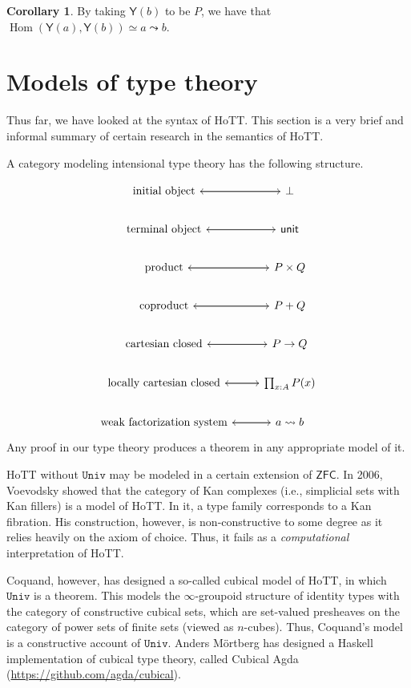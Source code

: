 \documentclass[10pt,letterpaper,cm]{nupset}
\theoremstyle{definition}
\theoremstyle{theorem}
\newtheorem{corollary}[definition]{Corollary}
\theoremstyle{remark}
\newcommand{\1}{\mathbf{1}}
\newcommand{\univ}{\mathtt{Univ}}
\newcommand{\0}{\vec 0}
\DeclareMathOperator{\Hom}{Hom}
\begin{document}
\begin{corollary}
By taking $\mathsf{Y}(b)$ to be $P$, we have that $\Hom(\mathsf{Y}(a), \mathsf{Y}(b)) \simeq a \leadsto b$.
\end{corollary}

\section{Models of type theory}

Thus far, we have looked at the syntax of HoTT. This section is a very brief and informal summary of certain research in the semantics of HoTT.

\medskip

A category modeling intensional type theory has the following structure.

\[
\begin{tikzcd}
\text{initial object} \arrow[r] & \bot \arrow[l] \\
\text{terminal object} \arrow[r] & \mathsf{unit} \arrow[l] \\
\text{product} \arrow[r] & P\times Q \arrow[l] \\
\text{coproduct} \arrow[r] & P + Q \arrow[l] \\
\text{cartesian closed} \arrow[r] & P \to Q \arrow[l] \\
\text{locally cartesian closed} \arrow[r] & \prod_{x:A}P(x) \arrow[l] \\
\text{weak factorization system} \arrow[r] & {a\leadsto b} \arrow[l]
\end{tikzcd}
\]
Any proof in our type theory produces a theorem in any appropriate model of it.

HoTT without $\univ$ may be modeled in a certain extension of $\mathsf{ZFC}$. In 2006, Voevodsky showed that the category of Kan complexes (i.e., simplicial sets with Kan fillers) is a model of HoTT.  In it, a type family corresponds to a Kan fibration.  His construction, however, is non-constructive to some degree as it relies heavily on the axiom of choice. Thus, it fails as a \emph{computational} interpretation of HoTT.

Coquand, however, has designed a so-called cubical model of HoTT, in which $\univ$ is a theorem. This models the $\infty$-groupoid structure of identity types with the category of constructive cubical sets, which are set-valued presheaves on the category of power sets of finite sets (viewed as $n$-cubes). Thus, Coquand's model is a constructive account of $\univ$.  
Anders M\"ortberg has designed a Haskell implementation of cubical type theory, called Cubical Agda (\url{https://github.com/agda/cubical}).
\end{document}
